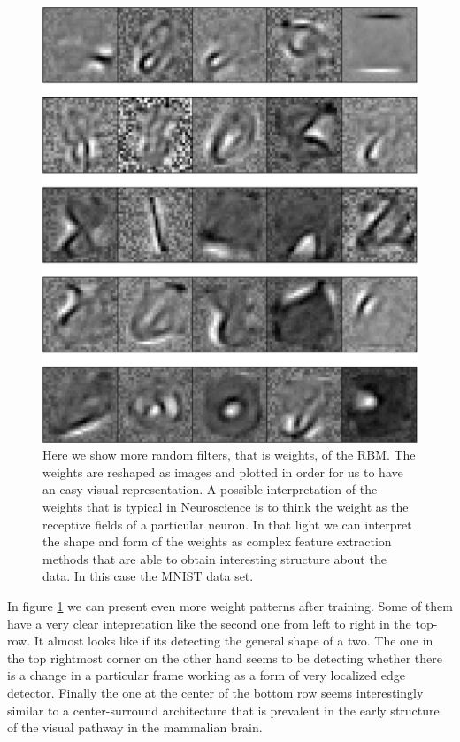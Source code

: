 \documentclass[11pt,a4paper]{article}
\begin{document}
\begin{center}
\begin{figure}[H]
\centering
\includegraphics[scale=.45]{final_filters1.pdf} 
\caption{Here we show more random filters, that is weights, of the RBM. The weights are reshaped as images and plotted in order for us to have an easy visual representation. A possible interpretation of the weights that is typical in Neuroscience is to think the weight as the receptive fields of a particular neuron. In that light we can interpret the shape and form of the weights as complex feature extraction methods that are able to obtain interesting structure about the data. In this case the MNIST data set.}
\label{fig:rbm_filters1}
\end{figure} 
\end{center}

In figure \ref{fig:rbm_filters1} we can present even more weight patterns after training. Some of them have a very clear intepretation like the second one from left to right in the top-row. It almost looks like if its detecting the general shape of a two. The one in the top rightmost corner on the other hand seems to be detecting whether there is a change in a particular frame working as a form of very localized edge detector. Finally  the one at the center of the bottom row seems interestingly similar to a center-surround architecture that is prevalent in the early structure of the visual pathway in the mammalian brain. 
\end{document}
